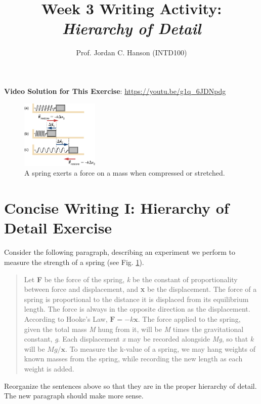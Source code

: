 \documentclass{article}
\begin{document}
\title{Week 3 Writing Activity: \textit{Hierarchy of Detail}}
\author{Prof. Jordan C. Hanson (INTD100)}

\maketitle

\textbf{Video Solution for This Exercise}: \url{https://youtu.be/g1q_6JDNpdg}
\begin{figure}
\centering
\includegraphics[width=0.33\textwidth]{figures/spring.jpeg}
\caption{\label{fig:1} A spring exerts a force on a mass when compressed or stretched.}
\end{figure}

\section{Concise Writing I: Hierarchy of Detail Exercise}

Consider the following paragraph, describing an experiment we perform to measure the strength of a spring (see Fig. \ref{fig:1}).
\begin{quotation}
Let \textbf{F} be the force of the spring, \textit{k} be the constant of proportionality between force and displacement, and \textbf{x} be the displacement.  The force of a spring is proportional to the distance it is displaced from its equilibrium length.  The force is always in the opposite direction as the displacement.  According to Hooke's Law, $\mathbf{F} = -k\mathbf{x}$.  The force applied to the spring, given the total mass \textit{M} hung from it, will be \textit{M} times the gravitational constant, \textit{g}.  Each displacement \textit{x} may be recorded alongside \textit{Mg}, so that $k$ will be $Mg/\mathbf{x}$.  To measure the k-value of a spring, we may hang weights of known masses from the spring, while recording the new length as each weight is added.
\end{quotation}

Reorganize the sentences above so that they are in the proper hierarchy of detail.  The new paragraph should make more sense.
\end{document}
